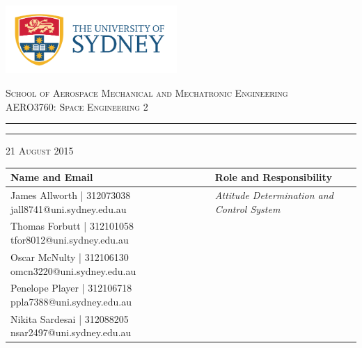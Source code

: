 \begin{titlepage}

\thispagestyle{empty}
\begin{center}
\begin{minipage}{\linewidth}
    \centering
    \includegraphics[width=6.5cm]{logo.png}
    \par
    \vspace{1.2cm}
    {\textsc{School of Aerospace Mechanical and Mechatronic Engineering \\ \vspace{0.3cm}
            AERO3760: Space Engineering 2}}
   \vspace{0.7cm}
	\hrule
    \vspace{1.5cm}
    {{\LARGE{}\par}}

    \vspace{1.5cm}
    \hrule
    \vspace{1.3cm}
     {\large \textsc{21 August 2015}}
\vspace{1.3cm}
    \begin{table}[H]
        \centering
        \vspace{0.2cm}
        \label{tab:maxturbulencealpha}
        {\renewcommand{\arraystretch}{1.7}%
            \begin{tabular}{|>{\centering\arraybackslash}m{6cm}|>{\centering\arraybackslash}m{9cm}|}
                \hline
                \textbf{Name and Email} & \textbf{Role and Responsibility} \\ \hline\hline
                James Allworth | 312073038  jall8741@uni.sydney.edu.au & \textit{Attitude Determination and Control System}  \\\hline
                Thomas Forbutt | 312101058  tfor8012@uni.sydney.edu.au &   \\\hline
                Oscar McNulty | 312106130  omcn3220@uni.sydney.edu.au &   \\\hline
                Penelope Player | 312106718  ppla7388@uni.sydney.edu.au &   \\\hline
                Nikita Sardesai | 312088205  nsar2497@uni.sydney.edu.au &   \\\hline
                \end{tabular} } 
        \end{table}



\end{minipage}
\end{center}
\end{titlepage}
